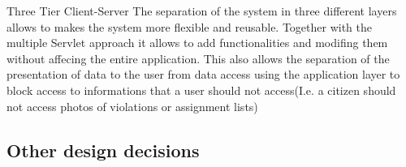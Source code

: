 Three Tier Client-Server
\newline
The separation of the system in three different layers allows to makes the system more flexible and reusable.
Together with the multiple Servlet approach it allows to add functionalities and modifing them without affecing the entire application.
This also allows the separation of the presentation of data to the user from data access using the application layer to block access to informations that a user should not access(I.e. a citizen should not access photos of violations or assignment lists)

\subsection{Other design decisions}











